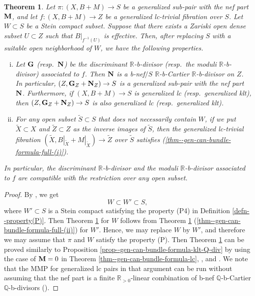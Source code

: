 \documentclass[12pt]{amsart}
\newtheorem{thm}{Theorem}[section]
\theoremstyle{definition}
\begin{document}
\begin{thm}\label{thm--gen-can-bundle-formula-full}
Let $\pi \colon (X,B+M) \to S$ be a generalized sub-pair with the nef part $\boldsymbol{\rm M}$, and let $f\colon (X,B+M) \to Z$ be a generalized lc-trivial fibration over $S$. 
Let $W \subset S$ be a Stein compact subset. 
Suppose that there exists a Zariski open dense subset $U \subset Z$ such that $B|_{f^{-1}(U)}$ is effective.
Then, after replacing $S$ with a suitable open neighborhood of $W$, we have the following properties.
\begin{enumerate}[(i)]
\item \label{thm--gen-can-bundle-formula-full-(i)}
Let $\boldsymbol{\rm G}$ (resp.~$\boldsymbol{\rm N}$) be the discriminant $\mathbb{R}$-b-divisor (resp.~the moduli $\mathbb{R}$-b-divisor) associated to $f$. 
Then $\boldsymbol{\rm N}$ is a b-nef$/S$ $\mathbb{R}$-b-Cartier $\mathbb{R}$-b-divisor on $Z$. 
In particular, $(Z, \boldsymbol{\rm G}_{Z} +\boldsymbol{\rm N}_{Z}) \to S$ is a generalized sub-pair with the nef part $\boldsymbol{\rm N}$. 
Furthermore, if $(X,B+M) \to S$ is generalized lc (resp.~generalized klt), then $(Z, \boldsymbol{\rm G}_{Z} +\boldsymbol{\rm N}_{Z}) \to S$ is also generalized lc (resp.~generalized klt). 
\item \label{thm--gen-can-bundle-formula-full-(ii)}
For any open subset $\tilde{S} \subset S$ that does not necessarily contain $W$, if we put $\tilde{X} \subset X$ and $\tilde{Z} \subset Z$ as the inverse images of $\tilde{S}$, then the generalized lc-trivial fibration $(\tilde{X}, B|_{\tilde{X}}+M|_{\tilde{X}}) \to \tilde{Z}$ over $\tilde{S}$ satisfies (\ref{thm--gen-can-bundle-formula-full-(i)}). 
\end{enumerate}
In particular, the discriminant $\mathbb{R}$-b-divisor and the moduli $\mathbb{R}$-b-divisor associated to $f$ are compatible with the restriction over any open subset. 
\end{thm}


\begin{proof}
By \cite[Lemma 2.16]{fujino-analytic-bchm}, we get
$$W \subset W' \subset S,$$
where $W'\subset S$ is a Stein compact satisfying the property (P4) in Definition \ref{defn--property(P)}. 
Then Theorem \ref{thm--gen-can-bundle-formula-full} for $W$ follows from Theorem \ref{thm--gen-can-bundle-formula-full} (\ref{thm--gen-can-bundle-formula-full-(ii)}) for $W'$. 
Hence, we may replace $W$ by $W'$, and therefore we may assume that $\pi$ and $W$ satisfy the property (P). 
Then Theorem \ref{thm--gen-can-bundle-formula-full} can be proved similarly to Proposition \ref{prop--gen-can-bundle-formula-klt-Q-div} by using the case of $\boldsymbol{\rm M}=0$ in Theorem \ref{thm--gen-can-bundle-formula-lc}, \cite{eh-semistablereduction}, and \cite{fujino-analytic-bchm}. 
We note that the MMP for generalized lc pairs in that argument can be run without assuming that the nef part is a finite $\mathbb{R}_{>0}$-linear combination of b-nef $\mathbb{Q}$-b-Cartier $\mathbb{Q}$-b-divisors (\cite[Section 4]{bz}). 
\end{proof}
\end{document}
